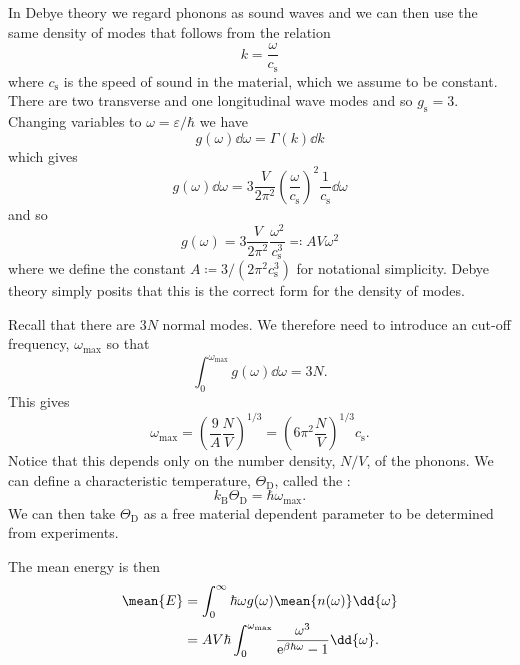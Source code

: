 \documentclass[fleqn]{NotesClass}
\newcommand*{\boltzmann}{k_{\mathrm{B}}}
\newcommand*{\e}{\mathrm{e}}
\begin{document}
    In Debye theory we regard phonons as sound waves and we can then use the same density of modes that follows from the relation
    \begin{equation}
        k = \frac{\omega}{c_{\mathrm{s}}}
    \end{equation}
    where \(c_{\mathrm{s}}\) is the speed of sound in the material, which we assume to be constant.
    There are two transverse and one longitudinal wave modes and so \(g_{\mathrm{s}} = 3\).
    Changing variables to \(\omega = \varepsilon/\hbar\) we have
    \begin{equation}
        g(\omega) \dd{\omega} = \Gamma(k) \dd{k}
    \end{equation}
    which gives
    \begin{equation}
        g(\omega) \dd{\omega} = 3\frac{V}{2\pi^2} \left( \frac{\omega}{c_{\mathrm{s}}} \right)^{2} \frac{1}{c_{\mathrm{s}}} \dd{\omega}
    \end{equation}
    and so
    \begin{equation}
        g(\omega) = 3\frac{V}{2\pi^2} \frac{\omega^2}{c_{\mathrm{s}}^3} \eqqcolon AV\omega^2
    \end{equation}
    where we define the constant \(A \coloneqq 3/(2\pi^2 c_{\mathrm{s}}^3)\) for notational simplicity.
    Debye theory simply posits that this is the correct form for the density of modes.
    
    Recall that there are \(3N\) normal modes.
    We therefore need to introduce an cut-off frequency, \(\omega_{\mathrm{max}}\) so that
    \begin{equation}
        \int_{0}^{\omega_{\mathrm{max}}} g(\omega) \dd{\omega} = 3N.
    \end{equation}
    This gives
    \begin{equation}
        \omega_{\mathrm{max}} = \left( \frac{9}{A} \frac{N}{V} \right)^{1/3} = \left( 6\pi^2 \frac{N}{V} \right)^{1/3} c_{\mathrm{s}}.
    \end{equation}
    Notice that this depends only on the number density, \(N/V\), of the phonons.
    We can define a characteristic temperature, \(\Theta_{\mathrm{D}}\), called the :
    \begin{equation}
        \boltzmann\Theta_{\mathrm{D}} = \hbar\omega_{\mathrm{max}}.
    \end{equation}
    We can then take \(\Theta_{\mathrm{D}}\) as a free material dependent parameter to be determined from experiments.
    
    The mean energy is then
    \begin{align}
        \mean{E} &= \int_{0}^{\infty} \hbar\omega g(\omega) \mean{n(\omega)} \dd{\omega}\\
        &= AV\hbar \int_{0}^{\omega_{\mathrm{max}}} \frac{\omega^3}{\e^{\beta\hbar\omega} - 1}\dd{\omega}.
    \end{align}
\end{document}
